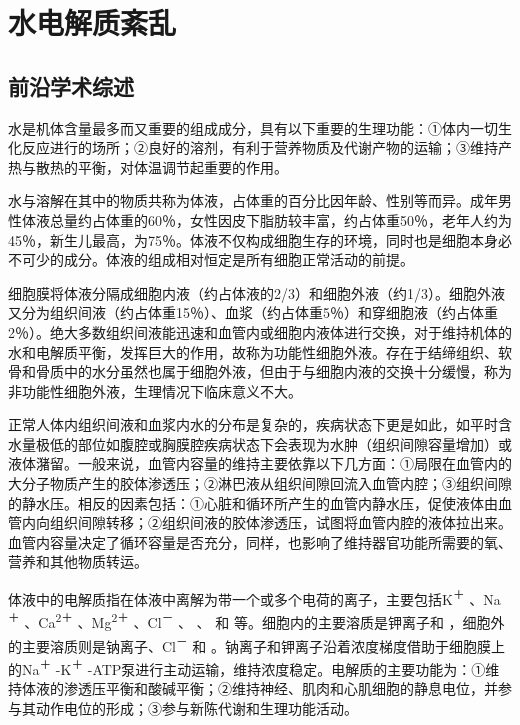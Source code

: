 \chapter{水电解质紊乱}

\section{前沿学术综述}

水是机体含量最多而又重要的组成成分，具有以下重要的生理功能：①体内一切生化反应进行的场所；②良好的溶剂，有利于营养物质及代谢产物的运输；③维持产热与散热的平衡，对体温调节起重要的作用。

水与溶解在其中的物质共称为体液，占体重的百分比因年龄、性别等而异。成年男性体液总量约占体重的60％，女性因皮下脂肪较丰富，约占体重50％，老年人约为45％，新生儿最高，为75％。体液不仅构成细胞生存的环境，同时也是细胞本身必不可少的成分。体液的组成相对恒定是所有细胞正常活动的前提。

细胞膜将体液分隔成细胞内液（约占体液的2/3）和细胞外液（约1/3）。细胞外液又分为组织间液（约占体重15％）、血浆（约占体重5％）和穿细胞液（约占体重2％）。绝大多数组织间液能迅速和血管内或细胞内液体进行交换，对于维持机体的水和电解质平衡，发挥巨大的作用，故称为功能性细胞外液。存在于结缔组织、软骨和骨质中的水分虽然也属于细胞外液，但由于与细胞内液的交换十分缓慢，称为非功能性细胞外液，生理情况下临床意义不大。

正常人体内组织间液和血浆内水的分布是复杂的，疾病状态下更是如此，如平时含水量极低的部位如腹腔或胸膜腔疾病状态下会表现为水肿（组织间隙容量增加）或液体潴留。一般来说，血管内容量的维持主要依靠以下几方面：①局限在血管内的大分子物质产生的胶体渗透压；②淋巴液从组织间隙回流入血管内腔；③组织间隙的静水压。相反的因素包括：①心脏和循环所产生的血管内静水压，促使液体由血管内向组织间隙转移；②组织间液的胶体渗透压，试图将血管内腔的液体拉出来。血管内容量决定了循环容量是否充分，同样，也影响了维持器官功能所需要的氧、营养和其他物质转运。

体液中的电解质指在体液中离解为带一个或多个电荷的离子，主要包括K\textsuperscript{＋}
、Na\textsuperscript{＋} 、Ca\textsuperscript{2＋}
、Mg\textsuperscript{2＋} 、Cl\textsuperscript{－}
、
、
和
等。细胞内的主要溶质是钾离子和
，细胞外的主要溶质则是钠离子、Cl\textsuperscript{－}
和
。钠离子和钾离子沿着浓度梯度借助于细胞膜上的Na\textsuperscript{＋}
-K\textsuperscript{＋}
-ATP泵进行主动运输，维持浓度稳定。电解质的主要功能为：①维持体液的渗透压平衡和酸碱平衡；②维持神经、肌肉和心肌细胞的静息电位，并参与其动作电位的形成；③参与新陈代谢和生理功能活动。

